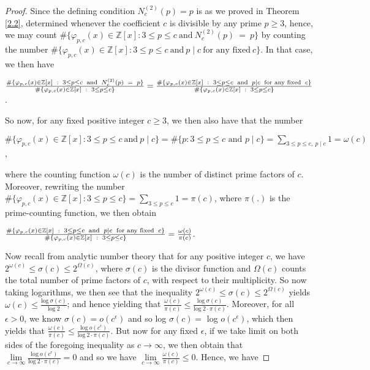 \documentclass{article}
\theoremstyle{plain}
\theoremstyle{definition}
\begin{document}
\begin{proof}
Since the defining condition $N_{c}^{(2)}(p) = p$ is as we proved in Theorem \ref{2.2}, determined whenever the coefficient $c$ is divisible by any prime $p\geq 3$, hence, we may count $\# \{\varphi_{p,c}(x) \in \mathbb{Z}[x] : 3\leq p\leq c \ \text{and} \ N_{c}^{(2)}(p) \ = \ p\}$ by counting the number $\# \{\varphi_{p,c}(x)\in \mathbb{Z}[x] : 3\leq p\leq c \ \text{and} \ p\mid c \ \text{for \ any \ fixed} \ c \}$. In that case, we then have 
\begin{center}
$\Large{\frac{\# \{\varphi_{p,c}(x) \in \mathbb{Z}[x] \ : \ 3\leq p\leq c \ \text{and} \ N_{c}^{(2)}(p) \ = \ p\}}{\Large{\# \{\varphi_{p,c}(x) \in \mathbb{Z}[x] \ : \ 3\leq p\leq c \}}}} = \Large{\frac{\# \{\varphi_{p,c}(x)\in \mathbb{Z}[x] \ : \ 3\leq p\leq c \ \text{and} \ p\mid c \ \text{for any fixed} \ c \}}{\Large{\# \{\varphi_{p,c}(x) \in \mathbb{Z}[x] \ : \ 3\leq p\leq c \}}}}$. 
\end{center}\indent So now, for any fixed positive integer $c\geq 3$, we then also have that the number 
\begin{center}
$\# \{\varphi_{p,c}(x) \in \mathbb{Z}[x] : 3\leq p\leq c \ \text{and} \ p\mid c \} = \# \{p : 3\leq p\leq c \text{ and } p\mid c \} = \sum_{3\leq p\leq c, \ p\mid c}1 = \omega (c)$,
\end{center}where the counting function $\omega(c)$ is the number of distinct prime factors of $c$. Moreover, rewriting the number $\# \{\varphi_{p,c}(x) \in \mathbb{Z}[x]  : 3\leq p\leq c \} = \sum_{3\leq p\leq c} 1 = \pi(c)$, where $\pi(.)$ is the prime-counting function, we then obtain  
\begin{center}
$\Large{\frac{\# \{\varphi_{p,c}(x)\in \mathbb{Z}[x] \ : \ 3\leq p\leq c \ \text{and} \ p\mid c \ \text{for any fixed} \ c \}}{\Large{\# \{\varphi_{p,c}(x)\in \mathbb{Z}[x] \ : \ 3\leq p\leq c \}}}} = \frac{\omega(c)}{\pi(c)}$.
\end{center}Now recall from analytic number theory that for any positive integer $c$, we have $2^{\omega(c)}\leq \sigma (c) \leq 2^{\Omega(c)}$, where $\sigma(c)$ is the divisor function and $\Omega(c)$ counts the total number of prime factors of $c$, with respect to their multiplicity. So now taking logarithms, we then see that the inequality $2^{\omega(c)}\leq \sigma (c) \leq 2^{\Omega(c)}$ yields $\omega(c)\leq \frac{\text{log} \ \sigma(c)}{\text{log} \ 2}$; and hence yielding that $\frac{\omega(c)}{\pi(c)} \leq \frac{\text{log} \ \sigma(c)}{\text{log} \ 2 \cdot \pi(c)}$. Moreover, for all $\epsilon >0$, we know $\sigma(c) = o(c^{\epsilon})$ and so log $\sigma(c) =$ log $o(c^{\epsilon})$, which then yields that $\frac{\omega(c)}{\pi(c)} \leq \frac{\text{log} \ o(c^{\epsilon})}{\text{log} \ 2 \cdot \pi(c)}$. But now for any fixed $\epsilon$, if we take limit on both sides of the foregoing inequality as $c\to \infty$, we then obtain that $\lim\limits_{c\to\infty} \frac{\text{log} \ o(c^{\epsilon})}{\text{log} \ 2 \cdot \pi(c)} = 0$ and so we have $\lim\limits_{c\to\infty} \frac{\omega(c)}{\pi(c)} \leq 0$. Hence, we have 

\end{proof}
\end{document}
